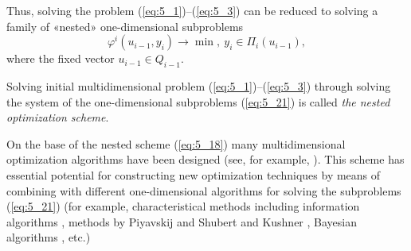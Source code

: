 Thus, solving the problem (\ref{eq:5_1})--(\ref{eq:5_3}) can be reduced to solving a family of «nested» one-dimensional subproblems 
\begin{equation}
\label{eq:5_21}
\varphi^i(u_{i-1},y_i)\rightarrow \min,\:y_i\in \Pi_i(u_{i-1}),
\end{equation}
where the fixed vector $u_{i-1}\in Q_{i-1}$.

Solving initial multidimensional problem (\ref{eq:5_1})--(\ref{eq:5_3})  through solving the system of the one-dimensional subproblems (\ref{eq:5_21}) is called \textit{the nested optimization scheme}.

On the base of the nested scheme (\ref{eq:5_18}) many multidimensional optimization algorithms have been designed (see, for example, \cite{5_CarrHowe, 5_Evtushenko, 5_GerGriIsr, 5_GriIsrAIP, 5_GriIsrCEUR, 5_GrishaginStrongin_EnginCybernetics, 5_Piyavskij, 5_SergGriJCAA, 5_ShiOlaf, 5_StrSergMon2000, 5_vanDam}). This scheme has essential potential for constructing new optimization techniques by means of combining with different one-dimensional algorithms for solving the subproblems (\ref{eq:5_21}) (for example, characteristical methods \cite{5_GrishaginSergeyevStrongin} including information    algorithms \cite{5_SergeyevLocTun, 5_Sergeyev1998, 5_SergeyevGrishaginOMS, 5_SergMukhKvasLera, 5_StrMonRus, 5_Str1973, 5_StrMarkin, 5_StrSergMon2000}, methods by Piyavskij and Shubert \cite{5_Piyavskij, 5_Shubert} and Kushner \cite{5_Kushner}, Bayesian algorithms \cite{5_Locatelli, 5_Mockus1980, 5_Mockus1988, 5_MockusEddy_et_al, 5_Zilinskas1975, 5_Zilinskas1981, 5_Zilinskas1985}, etc.) 

